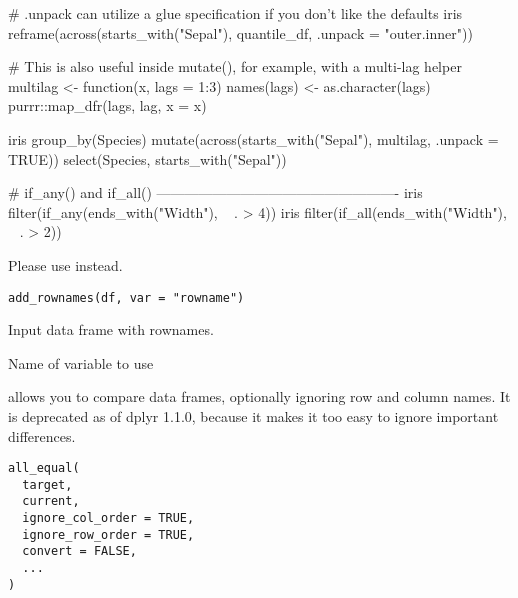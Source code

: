\documentclass[a4paper]{book}
\begin{document}
\begin{Examples}
\begin{ExampleCode}
# .unpack can utilize a glue specification if you don't like the defaults
iris %
  reframe(across(starts_with("Sepal"), quantile_df, .unpack = "{outer}.{inner}"))

# This is also useful inside mutate(), for example, with a multi-lag helper
multilag <- function(x, lags = 1:3) {
  names(lags) <- as.character(lags)
  purrr::map_dfr(lags, lag, x = x)
}

iris %
  group_by(Species) %
  mutate(across(starts_with("Sepal"), multilag, .unpack = TRUE)) %
  select(Species, starts_with("Sepal"))

# if_any() and if_all() ----------------------------------------------------
iris %
  filter(if_any(ends_with("Width"), ~ . > 4))
iris %
  filter(if_all(ends_with("Width"), ~ . > 2))

\end{ExampleCode}
\end{Examples}
%
\begin{Description}
\strong{[Deprecated]}
Please use  instead.
\end{Description}
%
\begin{Usage}
\begin{verbatim}
add_rownames(df, var = "rowname")
\end{verbatim}
\end{Usage}
%
\begin{Arguments}
\begin{ldescription}
\item[\code{df}] Input data frame with rownames.

\item[\code{var}] Name of variable to use
\end{ldescription}
\end{Arguments}
%
\begin{Description}
\strong{[Deprecated]}

 allows you to compare data frames, optionally ignoring
row and column names. It is deprecated as of dplyr 1.1.0, because it
makes it too easy to ignore important differences.
\end{Description}
%
\begin{Usage}
\begin{verbatim}
all_equal(
  target,
  current,
  ignore_col_order = TRUE,
  ignore_row_order = TRUE,
  convert = FALSE,
  ...
)
\end{verbatim}
\end{Usage}
\end{document}
